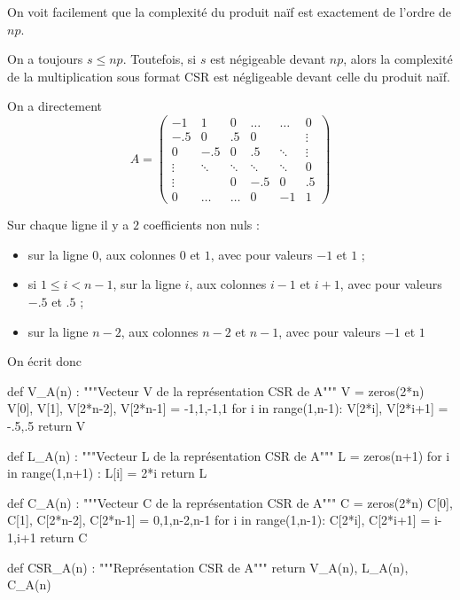 \question{} 
On voit facilement que la complexité du produit naïf est exactement de l'ordre de $np$. 

On a toujours $s \leq np$. Toutefois, si $s$ est négigeable devant $np$, alors la complexité de la multiplication sous format CSR est négligeable devant celle du produit naïf. 

\question{}
On a directement 
\begin{equation*}
    A = \begin{pmatrix}
            -1     & 1      & 0      & \dots  & \dots  & 0\\
            -.5    & 0      & .5     & 0      &        & \vdots \\
            0      & -.5    &   0    & .5     & \ddots & \vdots \\
            \vdots & \ddots & \ddots & \ddots & \ddots & 0 \\
            \vdots &        & 0      & -.5    & 0      & .5 \\
            0      & \dots  & \dots  & 0      & -1     & 1    
        \end{pmatrix}
\end{equation*}

\question{}
Sur chaque ligne il y a $2$ coefficients non nuls : 
\begin{itemize}
    \item sur la ligne \no$0$, aux colonnes $0$ et $1$, avec pour valeurs $-1$ et $1$ ; 
    \item si $1 \leq i < n-1$, sur la ligne \no$i$, aux colonnes $i-1$ et $i+1$, avec pour valeurs $-.5$ et $.5$ ; 
    \item sur la ligne \no$n-2$, aux colonnes $n-2$ et $n-1$, avec pour valeurs $-1$ et $1$
\end{itemize}
On écrit donc 
\begin{pyverbatim}
def V_A(n) :
    """Vecteur V de la représentation CSR de A"""
    V = zeros(2*n)
    V[0], V[1], V[2*n-2], V[2*n-1] = -1,1,-1,1
    for i in range(1,n-1):
        V[2*i], V[2*i+1] = -.5,.5
    return V

def L_A(n) :
    """Vecteur L de la représentation CSR de A"""
    L = zeros(n+1)
    for i in range(1,n+1) :
        L[i] = 2*i
    return L

def C_A(n) :
    """Vecteur C de la représentation CSR de A"""
    C = zeros(2*n)
    C[0], C[1], C[2*n-2], C[2*n-1] = 0,1,n-2,n-1
    for i in range(1,n-1):
        C[2*i], C[2*i+1] = i-1,i+1
    return C

def CSR_A(n) :
    """Représentation CSR de A"""
    return V_A(n), L_A(n), C_A(n)
\end{pyverbatim}
